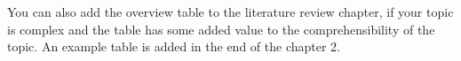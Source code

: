 You can also add the overview table to the literature review chapter, if your topic is complex and the table has some added value to the comprehensibility of the topic. An example table is added in the end of the chapter 2. 
